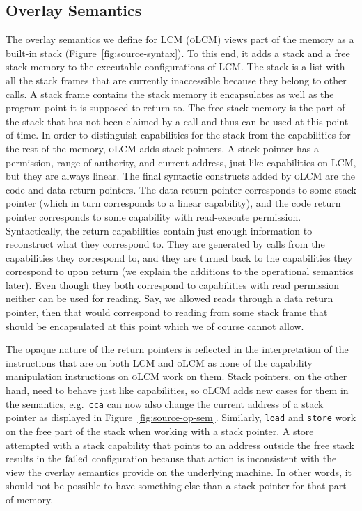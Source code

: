 \documentclass[acmsmall,review,anonymous]{acmart}\settopmatter{printfolios=true,printccs=false,printacmref=false}
\newcommand{\trgcm}{\textsc{LCM}}
\newcommand{\srccm}{\textsc{oLCM}}
\begin{document}
\subsection{Overlay Semantics}
The overlay semantics we define for \trgcm{} (\srccm{}) views part of the memory as a built-in stack (Figure~\ref{fig:source-syntax}).
To this end, it adds a stack and a free stack memory to the executable configurations of \trgcm{}.
The stack is a list with all the stack frames that are currently inaccessible because they belong to other calls.
A stack frame contains the stack memory it encapsulates as well as the program point it is supposed to return to.
The free stack memory is the part of the stack that has not been claimed by a call and thus can be used at this point of time.
In order to distinguish capabilities for the stack from the capabilities for the rest of the memory, \srccm{} adds stack pointers.
A stack pointer has a permission, range of authority, and current address, just like capabilities on \trgcm{}, but they are always linear.
The final syntactic constructs added by \srccm{} are the code and data return pointers.
The data return pointer corresponds to some stack pointer (which in turn corresponds to a linear capability), and the code return pointer corresponds to some capability with read-execute permission.
Syntactically, the return capabilities contain just enough information to reconstruct what they correspond to.
They are generated by calls from the capabilities they correspond to, and they are turned back to the capabilities they correspond to upon return (we explain the additions to the operational semantics later).
Even though they both correspond to capabilities with read permission neither can be used for reading. 
Say, we allowed reads through a data return pointer, then that would correspond to reading from some stack frame that should be encapsulated at this point which we of course cannot allow.

The opaque nature of the return pointers is reflected in the interpretation of the instructions that are on both \trgcm{} and \srccm{} as none of the capability manipulation instructions on \srccm{} work on them.
Stack pointers, on the other hand, need to behave just like capabilities, so \srccm{} adds new cases for them in the semantics, e.g.\ \texttt{cca} can now also change the current address of a stack pointer as displayed in Figure~\ref{fig:source-op-sem}.
Similarly, \texttt{load} and \texttt{store} work on the free part of the stack when working with a stack pointer.
A store attempted with a stack capability that points to an address outside the free stack results in the $\mathrm{failed}$ configuration because that action is inconsistent with the view the overlay semantics provide on the underlying machine.
In other words, it should not be possible to have something else than a stack pointer for that part of memory.
\end{document}
